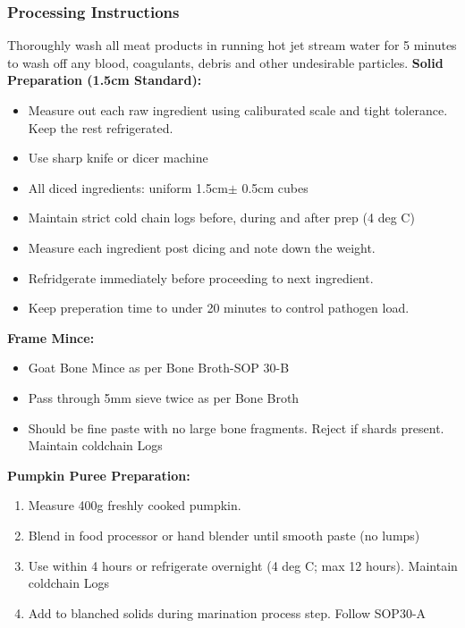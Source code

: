 \subsubsection*{Processing Instructions}
\item Thoroughly wash all meat products in running hot jet stream water for 5 minutes to wash off any blood, coagulants, debris and other undesirable particles. 
\textbf{Solid Preparation (1.5cm Standard):}
\begin{itemize}
\item Measure out each raw ingredient using caliburated scale and tight tolerance. Keep the rest refrigerated.
\item Use sharp knife or dicer machine
\item All diced ingredients: uniform 1.5cm$\pm$ 0.5cm cubes
\item Maintain strict cold chain logs before, during and after prep (4 deg C)
\item Measure each ingredient post dicing and note down the weight. 
\item Refridgerate immediately before proceeding to next ingredient. 
\item Keep preperation time to under 20 minutes to control pathogen load. 
\end{itemize}

\textbf{Frame Mince:}
\begin{itemize}
\item Goat Bone Mince as per Bone Broth-SOP 30-B
\item Pass through 5mm sieve twice as per Bone Broth 
\item Should be fine paste with no large bone fragments. Reject if shards present. Maintain coldchain Logs
\end{itemize}

\textbf{Pumpkin Puree Preparation:}
\begin{enumerate}
\item Measure 400g freshly cooked pumpkin. 
\item Blend in food processor or hand blender until smooth paste (no lumps)
\item Use within 4 hours or refrigerate overnight (4 deg C; max 12 hours). Maintain coldchain Logs
\item Add to blanched solids during marination process step. Follow SOP30-A
\end{enumerate}


